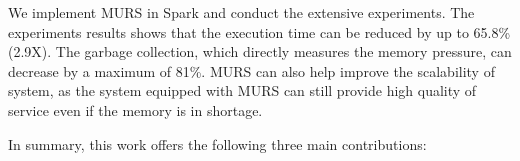 

We implement MURS in Spark and conduct the extensive experiments. The experiments results shows that the execution time can be reduced by up to 65.8\% (2.9X). The garbage collection, which directly measures the memory pressure, can decrease by a maximum of 81\%. MURS can also help improve the scalability of system, as the system equipped with MURS can still provide high quality of service even if the memory is in shortage. 

In summary, this work offers the following three main contributions:

